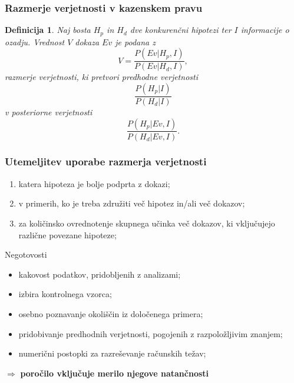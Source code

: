 \documentclass{beamer}
\newtheorem{definicija}{Definicija}
\begin{document}
\begin{frame}
    \frametitle{Razmerje verjetnosti v kazenskem pravu}
    \begin{definicija}
        Naj bosta  $H_p$ in $H_d$ dve konkurenčni hipotezi ter $I$ informacije o ozadju. Vrednost $V$ dokaza $Ev$ je podana z
        \[
            V = \frac{P(Ev \lvert H_p, I)}{P(Ev \lvert H_d, I)},
        \]
        razmerje verjetnosti, ki pretvori predhodne verjetnosti
        \[
            \frac{P(H_p \lvert I)}{P(H_d \lvert I)} 
        \]
        v posteriorne verjetnosti
        \[
            \frac{P(H_p \lvert Ev, I)}{P(H_d \lvert Ev, I)}.
        \]
     \end{definicija}     
\end{frame}

\begin{frame}
    \frametitle{Utemeljitev uporabe razmerja verjetnosti}
    \begin{enumerate}
        \item katera hipoteza je bolje podprta z dokazi;
        \item v primerih, ko je treba združiti več hipotez in/ali več dokazov;
        \item za količinsko ovrednotenje skupnega učinka več dokazov, ki vključujejo različne povezane hipoteze;
    \end{enumerate} \vspace{3mm}
    \begin{block}{Negotovosti}
        \begin{itemize}
            \item kakovost podatkov, pridobljenih z analizami;
            \item izbira kontrolnega vzorca;
            \item osebno poznavanje okoliščin iz določenega primera;
            \item pridobivanje predhodnih verjetnosti, pogojenih z razpoložljivim znanjem;
            \item numerični postopki za razreševanje računskih težav;
        \end{itemize}
    \end{block} \vspace{2mm}
    \centering
    $\Rightarrow$ \textbf{poročilo vključuje merilo njegove natančnosti}
\end{frame}
\end{document}

